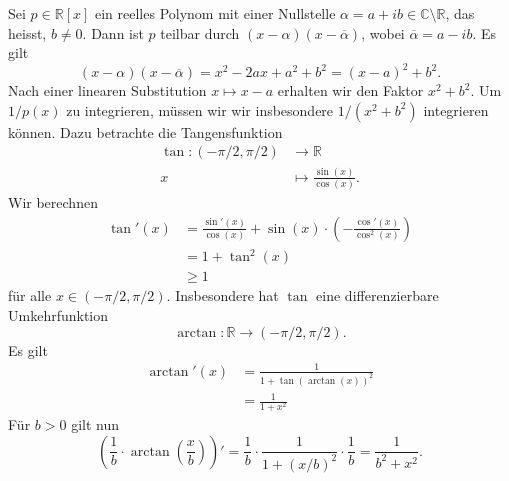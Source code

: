 \documentclass[../main.tex]{subfiles}
\begin{document}
\begin{remark}
  Sei $p \in \mathbb{R}[x]$ ein reelles Polynom mit
  einer Nullstelle $\alpha = a + ib \in \mathbb{C} \setminus \mathbb{R}$, das heisst, $b \neq 0$.
  Dann ist $p$ teilbar durch $(x - \alpha) (x - \overline \alpha)$,
  wobei $\overline \alpha = a - ib$.
  Es gilt
   \[
     (x - \alpha) ( x - \overline \alpha) = x^2 - 2ax + a^2 + b^2
     = {(x - a)}^2 + b^2.
  \]
  Nach einer linearen Substitution $x \mapsto x - a$
  erhalten wir den Faktor $x^2 + b^2$.
  Um $1/p(x)$ zu integrieren, müssen wir wir insbesondere
  $1/(x^2 + b^2)$ integrieren können.
  Dazu betrachte die Tangensfunktion
  \begin{align*}
    \tan \colon (-\pi/2, \pi/2) & \to \mathbb{R} \\
    x & \mapsto \frac{\sin(x)}{\cos(x)}.
  \end{align*}
  Wir berechnen
  \begin{align*}
    \tan'(x)
    &=\frac{\sin'(x)}{\cos(x)} + \sin(x) \cdot
    \left( - \frac{\cos'(x)}{\cos^2(x)} \right)\\
    &= 1 + \tan^2(x) \\
    &\geq 1
  \end{align*}
  für alle $x \in (-\pi/2, \pi/2)$.
  Insbesondere hat $\tan$ eine differenzierbare Umkehrfunktion
  \[
    \arctan \colon \mathbb{R} \to (- \pi/2, \pi/2).
  \]
  Es gilt
  \begin{align*}
    \arctan'(x)
    & = \frac{1}{1 + {\tan(\arctan(x))}^2}\\
    & = \frac{1}{1 + x^2}
  \end{align*}
  Für $b > 0$ gilt nun
  \[
    \left( \frac{1}{b} \cdot \arctan \left( \frac{x}{b} \right) \right)'
    = \frac{1}{b} \cdot \frac{1}{1 + {(x/b)}^2} \cdot \frac{1}{b}
    = \frac{1}{b^2 + x^2}.
  \]






\end{remark}
\end{document}
